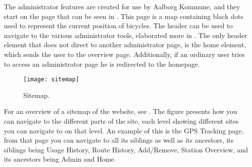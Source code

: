 The administrator features are created for use by Aalborg Kommune, and they start on the page that can be seen in .
This page is a map containing black dots used to represent the current position of bicycles.
The header can be used to navigate to the various administrator tools, elaborated more in .
The only header element that does not direct to another administrator page, is the home element, which sends the user to the overview page.
Additionally, if an ordinary user tries to access an administrator page he is redirected to the homepage.

\begin{figure}[h]
	\centering
	\texttt{[image: sitemap]}
	\caption{Sitemap.}\label{fig:sitemap}
\end{figure}

For an overview of a sitemap of the website, see .
The figure presents how you can navigate to the different parts of the site, each level showing different sites you can navigate to on that level.
An example of this is the GPS Tracking page, from that page you can navigate to all its siblings as well as its ancestors, its siblings being Usage History, Route History, Add/Remove, Station Overview, and its ancestors being Admin and Home.
